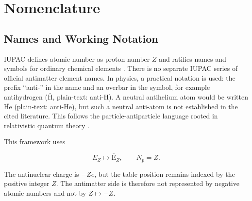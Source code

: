 \documentclass[11pt,a4paper]{article}
\newcommand{\antiH}{\ensuremath{\overline{\mathrm{H}}}}
\newcommand{\antiHe}{\ensuremath{\overline{\mathrm{He}}}}
\newcommand{\antiE}{\ensuremath{\overline{\mathrm{E}}}}
\begin{document}
\section{Nomenclature}

\subsection{Names and Working Notation}

IUPAC defines atomic number as proton number $Z$ and ratifies names and symbols for ordinary chemical elements \cite{IUPACatomicnumber,IUPAC113118}. There is no separate IUPAC series of official antimatter element names. In physics, a practical notation is used: the prefix \enquote{anti-} in the name and an overbar in the symbol, for example antihydrogen (\antiH, plain-text: anti-H). A neutral antihelium atom would be written \antiHe{} (plain-text: anti-He), but such a neutral anti-atom is not established in the cited literature. This follows the particle-antiparticle language rooted in relativistic quantum theory \cite{Dirac1928}.

This framework uses

\begin{equation}
E_Z \longmapsto \antiE_Z,
\qquad
N_{\bar p}=Z .
\end{equation}

The antinuclear charge is $-Ze$, but the table position remains indexed by the positive integer $Z$. The antimatter side is therefore not represented by negative atomic numbers and not by $Z\mapsto -Z$.
\end{document}

